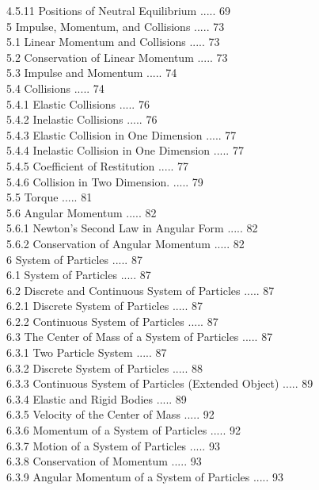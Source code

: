 \documentclass[10pt]{article}
\begin{document}
4.5.11 Positions of Neutral Equilibrium ..... 69\\
5 Impulse, Momentum, and Collisions ..... 73\\
5.1 Linear Momentum and Collisions ..... 73\\
5.2 Conservation of Linear Momentum ..... 73\\
5.3 Impulse and Momentum ..... 74\\
5.4 Collisions ..... 74\\
5.4.1 Elastic Collisions ..... 76\\
5.4.2 Inelastic Collisions ..... 76\\
5.4.3 Elastic Collision in One Dimension ..... 77\\
5.4.4 Inelastic Collision in One Dimension ..... 77\\
5.4.5 Coefficient of Restitution ..... 77\\
5.4.6 Collision in Two Dimension. ..... 79\\
5.5 Torque ..... 81\\
5.6 Angular Momentum ..... 82\\
5.6.1 Newton's Second Law in Angular Form ..... 82\\
5.6.2 Conservation of Angular Momentum ..... 82\\
6 System of Particles ..... 87\\
6.1 System of Particles ..... 87\\
6.2 Discrete and Continuous System of Particles ..... 87\\
6.2.1 Discrete System of Particles ..... 87\\
6.2.2 Continuous System of Particles ..... 87\\
6.3 The Center of Mass of a System of Particles ..... 87\\
6.3.1 Two Particle System ..... 87\\
6.3.2 Discrete System of Particles ..... 88\\
6.3.3 Continuous System of Particles (Extended Object) ..... 89\\
6.3.4 Elastic and Rigid Bodies ..... 89\\
6.3.5 Velocity of the Center of Mass ..... 92\\
6.3.6 Momentum of a System of Particles ..... 92\\
6.3.7 Motion of a System of Particles ..... 93\\
6.3.8 Conservation of Momentum ..... 93\\
6.3.9 Angular Momentum of a System of Particles ..... 93\\
\end{document}
